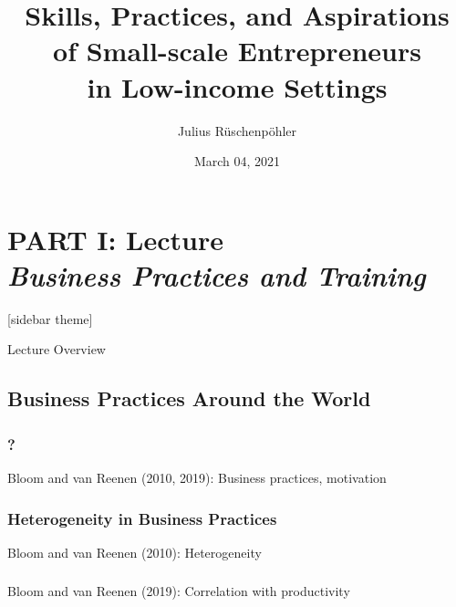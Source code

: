 \documentclass[hideothersubsections, usenames,dvipsnames,11pt]{beamer}
\title[]{Skills, Practices, and Aspirations \\ of Small-scale Entrepreneurs \\ in Low-income Settings}
\author[]{Julius R{\"u}schenp{\"o}hler\inst{}}
\institute[]{\inst{} UC Berkeley, CEGA}
\date{March 04, 2021}
\newenvironment{itemize_2pt}{\itemize\addtolength{\itemsep}{2pt}}{\enditemize}
\begin{document}
\section{\textbf{PART I: Lecture} \\ \quad \emph{Business Practices and Training}}



\begin{frame}
\titlepage
\end{frame}


[sidebar theme]

\begin{frame}{Lecture Overview}
\end{frame}


\subsection{Business Practices Around the World}

\begin{frame}
\frametitle{?}
	\begin{itemize_2pt}
	\item Bloom and van Reenen (2010, 2019): Business practices, motivation \citep{Bloom2010, Bloom2019}
	\vspace{0.1in}
	\end{itemize_2pt}
\end{frame}

\begin{frame}
\frametitle{Heterogeneity in Business Practices}
	\begin{itemize_2pt}
	\item Bloom and van Reenen (2010): Heterogeneity \citep{Bloom2010}
	\vspace{0.1in}
	\end{itemize_2pt}
\end{frame}

\begin{frame}
\frametitle{}
	\begin{itemize_2pt}
	\item Bloom and van Reenen (2019): Correlation with productivity \citep{Bloom2019}
	\vspace{0.1in}
	\end{itemize_2pt}
\end{frame}

\end{document}
